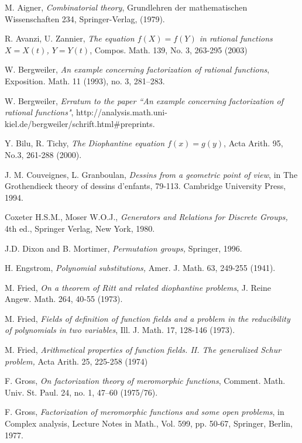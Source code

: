 \documentclass{amsart}
\begin{document}

\begin{thebibliography}{10}

 M. Aigner,
\textit{Combinatorial theory},
Grundlehren der mathematischen Wissenschaften 234, Springer-Verlag, (1979).

 R. Avanzi, U. Zannier,
\textit{The equation $f(X) = f(Y)$ in rational functions $X = X(t)$, $Y = Y(t)$},
Compos. Math. 139, No. 3, 263-295 (2003)

 W. Bergweiler, \textit{An example concerning factorization of rational functions}, Exposition. Math.  11  (1993),  no. 3, 281--283.

 W. Bergweiler, \textit{Erratum to the paper ``An example concerning factorization of rational functions"}, http://analysis.math.uni-kiel.de/bergweiler/schrift.html{\#}preprints.

 Y. Bilu, R. Tichy,
\textit{The Diophantine equation $f(x) = g(y)$},
Acta Arith. 95, No.3, 261-288 (2000).

 J. M. Couveignes, L. Granboulan, \textit{Dessins from a geometric point of view},
in The Grothendieck theory of dessins d'enfants, 79-113. Cambridge University Press, 1994.

 Coxeter H.S.M., Moser W.O.J.,
\textit{Generators and Relations for Discrete Groups,} 4th ed., Springer Verlag, New York, 1980.

 J.D. Dixon and B. Mortimer, \textit{Permutation groups,} Springer, 1996.

 H. Engstrom, \textit{Polynomial substitutions,} Amer. J. Math. 63, 249-255 (1941).

 M. Fried,
\textit{On a theorem of Ritt and related diophantine problems},
J. Reine Angew. Math. 264, 40-55 (1973).

 M. Fried,
\textit{Fields of definition of function fields and a problem in the reducibility of polynomials in two variables}, Ill. J. Math. 17, 128-146 (1973).

 M. Fried, \textit{
Arithmetical properties of function fields. II. The generalized Schur problem,} Acta Arith. 25, 225-258 (1974)

 F. Gross, \textit{On factorization theory of meromorphic functions},  Comment. Math. Univ. St. Paul.  24, no. 1, 47--60 (1975/76).

 F. Gross, \textit{Factorization of meromorphic functions and some open problems}, in Complex analysis, Lecture Notes in Math., Vol. 599, pp. 50-67, Springer, Berlin, 1977.


\end{thebibliography}
\end{document}
